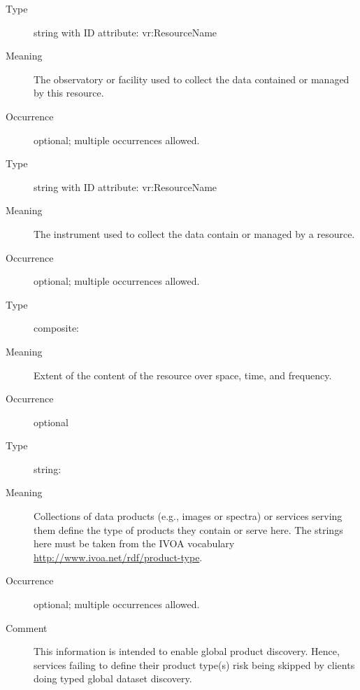 \documentclass[11pt,a4paper]{ivoa}
\begin{document}
\begin{generated}
\begingroup\small\begin{bigdescription}\item[Element \xmlel{facility}]
\begin{description}
\item[Type] string with ID attribute: vr:ResourceName
\item[Meaning] The observatory or facility used to collect the data
                     contained or managed by this resource.
\item[Occurrence] optional; multiple occurrences allowed.

\end{description}
\item[Element \xmlel{instrument}]
\begin{description}
\item[Type] string with ID attribute: vr:ResourceName
\item[Meaning] The instrument used to collect the data contain or
                     managed by a resource.
\item[Occurrence] optional; multiple occurrences allowed.

\end{description}
\item[Element \xmlel{coverage}]
\begin{description}
\item[Type] composite: 
\item[Meaning] Extent of the content of the resource over space, time,
                     and frequency.
\item[Occurrence] optional

\end{description}
\item[Element \xmlel{productTypeServed}]
\begin{description}
\item[Type] string: 
\item[Meaning] Collections of data products (e.g., images or spectra)
	              		or services serving them define the type of products
	              		they contain or serve here.  The strings here must
	              		be taken from the IVOA vocabulary
	              		\url{http://www.ivoa.net/rdf/product-type}.
\item[Occurrence] optional; multiple occurrences allowed.
\item[Comment] This information is intended
	              		to enable global product discovery.  Hence, services
	              		failing to define their product type(s) risk being skipped
	              		by clients doing typed global dataset discovery.


\end{description}
\end{bigdescription}
\end{generated}
\end{document}
